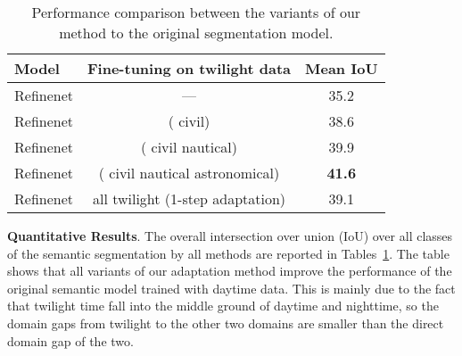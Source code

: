 \documentclass[letterpaper, 10 pt, conference]{ieeeconf}
\begin{document}
\begin{table}[!tb]
  \centering
  \caption{Performance comparison between the variants of our method to the original segmentation model.}
  \label{table:experiments}
  \setlength\tabcolsep{5pt}
    \begin{tabular}{lcc}
Model   & Fine-tuning on twilight data  & Mean IoU \\
\toprule
Refinenet \cite{refinenet} & --- & 35.2 \\
\midrule
Refinenet  &  ( civil) & 38.6 \\
Refinenet  &  (  civil    nautical) & 39.9 \\
Refinenet  &  ( civil    nautical  astronomical) & \textbf{41.6} \\
\midrule
Refinenet &  all twilight (1-step adaptation) & 39.1 \\
\end{tabular}
\vspace{-2mm}
\end{table}

 
\textbf{Quantitative Results}. 
The overall intersection over union (IoU) over all classes of the semantic segmentation by all methods are reported in Tables~\ref{table:experiments}. The table shows that all variants of our adaptation method improve the performance of the original semantic model trained with daytime data. This is mainly due to the fact that twilight time fall into the middle ground of daytime and nighttime, so the domain gaps from twilight to the other two domains are smaller than the direct domain gap of the two.
\end{document}
